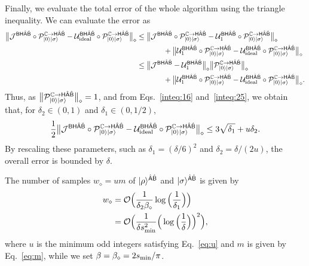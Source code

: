 Finally, we evaluate the total error of the whole algorithm using the triangle inequality. 
We can evaluate the error as
\begin{align}
    \big\|\cJ^{\sB\sH\hat{\sA}\hat{\sB}}\circ\cP_{\ket{0}\ket{\sigma}}^{\bC\rarr\sH\hat{\sA}\hat{\sB}} - \cU_{\rm ideal}^{\sB\sH\hat{\sA}\hat{\sB}}\circ\cP_{\ket{0}\ket{\sigma}}^{\bC\rarr\sH\hat{\sA}\hat{\sB}}\big\|_\diamond  
    &\leq \big\|\cJ^{\sB\sH\hat{\sA}\hat{\sB}}\circ\cP_{\ket{0}\ket{\sigma}}^{\bC\rarr\sH\hat{\sA}\hat{\sB}} - \cU_1^{\sB\sH\hat{\sA}\hat{\sB}}\circ\cP_{\ket{0}\ket{\sigma}}^{\bC\rarr\sH\hat{\sA}\hat{\sB}}\big\|_\diamond     \notag\\
    &\hspace{3pc}+ \big\|\cU_1^{\sB\sH\hat{\sA}\hat{\sB}}\circ\cP_{\ket{0}\ket{\sigma}}^{\bC\rarr\sH\hat{\sA}\hat{\sB}} - \cU_{\rm ideal}^{\sB\sH\hat{\sA}\hat{\sB}}\circ\cP_{\ket{0}\ket{\sigma}}^{\bC\rarr\sH\hat{\sA}\hat{\sB}}\big\|_\diamond \\
    &\leq \big\|\cJ^{\sB\sH\hat{\sA}\hat{\sB}} - \cU_1^{\sB\sH\hat{\sA}\hat{\sB}}\big\|_\diamond \big\|\cP_{\ket{0}\ket{\sigma}}^{\bC\rarr\sH\hat{\sA}\hat{\sB}}\big\|_\diamond    \notag\\
    &\hspace{3pc}+ \big\|\cU_1^{\sB\sH\hat{\sA}\hat{\sB}}\circ\cP_{\ket{0}\ket{\sigma}}^{\bC\rarr\sH\hat{\sA}\hat{\sB}} - \cU_{\rm ideal}^{\sB\sH\hat{\sA}\hat{\sB}}\circ\cP_{\ket{0}\ket{\sigma}}^{\bC\rarr\sH\hat{\sA}\hat{\sB}}\big\|_\diamond.
\end{align}
Thus, as $\big\|{\mathcal{P}}_{|0\rangle|\sigma\rangle}^{\mathbb{C}\rightarrow{\mathsf{H}}\hat{{\mathsf{A}}}\hat{{\mathsf{B}}}}\big\|_\diamond = 1$, and from Eqs.~\eqref{inteq:16} and~\eqref{inteq:25}, we obtain that, for $\delta_2 \in (0, 1)$ and $\delta_1 \in (0, 1/2)$,
\begin{align}
\label{inteq:103}
    \frac{1}{2} \big\|{\mathcal{J}}^{{\mathsf{B}}{\mathsf{H}}\hat{{\mathsf{A}}}\hat{{\mathsf{B}}}}\circ{\mathcal{P}}_{|0\rangle|\sigma\rangle}^{\mathbb{C}\rightarrow{\mathsf{H}}\hat{{\mathsf{A}}}\hat{{\mathsf{B}}}} - {\mathcal{U}}_{\rm ideal}^{{\mathsf{B}}{\mathsf{H}}\hat{{\mathsf{A}}}\hat{{\mathsf{B}}}}\circ{\mathcal{P}}_{|0\rangle|\sigma\rangle}^{\mathbb{C}\rightarrow{\mathsf{H}}\hat{{\mathsf{A}}}\hat{{\mathsf{B}}}}\big\|_\diamond
    \leq 3\sqrt{\delta_1} + u\delta_2.
\end{align}
By rescaling these parameters, such as $\delta_1 = (\delta/6)^2$ and $\delta_2 = \delta/(2u)$, the overall error is bounded by $\delta$.


The number of samples $w_\diamond = um$ of $|\rho\rangle^{\hat{{\mathsf{A}}}\hat{{\mathsf{B}}}}$ and $|\sigma\rangle^{\hat{{\mathsf{A}}}\hat{{\mathsf{B}}}}$ is given by 
\begin{align}
    w_\diamond 
    &= {\mathcal{O}}\Big(\frac{1}{\delta_2 \beta_\diamond}\log{\Big(\frac{1}{\delta_1}\Big)}\Big) \\
    &= {\mathcal{O}}\Big(\frac{1}{\delta s_{\rm min}^2}\Big(\log{\Big(\frac{1}{\delta}\Big)}\Big)^2\Big),
\end{align}
where $u$ is the minimum odd integers satisfying Eq.~\eqref{eq:u} and $m$ is given by Eq.~\eqref{eq:m}, while we set $\beta = \beta_\diamond = 2 s_{\rm min}/\pi$.


